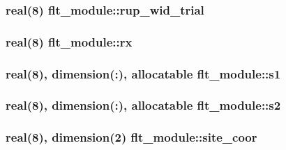 \subsubsection[{rup\+\_\+wid\+\_\+trial}]{\setlength{\rightskip}{0pt plus 5cm}real(8) flt\+\_\+module\+::rup\+\_\+wid\+\_\+trial}\label{namespaceflt__module_a6cefaab59a5e1f02e62505b132fe9384}
\hypertarget{namespaceflt__module_a8fa2cff4d9d0c963d1d2e99f399211c5}{}
\subsubsection[{rx}]{\setlength{\rightskip}{0pt plus 5cm}real(8) flt\+\_\+module\+::rx}\label{namespaceflt__module_a8fa2cff4d9d0c963d1d2e99f399211c5}
\hypertarget{namespaceflt__module_a388db17b48dfcaeb0b4c53d1a23f83b6}{}
\subsubsection[{s1}]{\setlength{\rightskip}{0pt plus 5cm}real(8), dimension(\+:), allocatable flt\+\_\+module\+::s1}\label{namespaceflt__module_a388db17b48dfcaeb0b4c53d1a23f83b6}
\hypertarget{namespaceflt__module_a774958e9c5ad266c9faed76a724e27ac}{}
\subsubsection[{s2}]{\setlength{\rightskip}{0pt plus 5cm}real(8), dimension(\+:), allocatable flt\+\_\+module\+::s2}\label{namespaceflt__module_a774958e9c5ad266c9faed76a724e27ac}
\hypertarget{namespaceflt__module_a2aeddbabcca2c320d94712a5ef502b79}{}
\subsubsection[{site\+\_\+coor}]{\setlength{\rightskip}{0pt plus 5cm}real(8), dimension(2) flt\+\_\+module\+::site\+\_\+coor}\label{namespaceflt__module_a2aeddbabcca2c320d94712a5ef502b79}
\hypertarget{namespaceflt__module_ad4dbd8fe640ed7c127b993e51b31c2cb}{}
